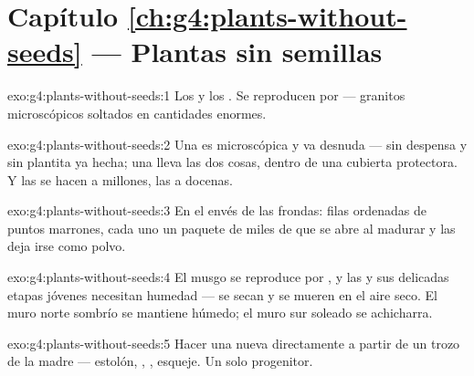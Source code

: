 \section*{Capítulo \ref{ch:g4:plants-without-seeds} --- Plantas sin semillas}

\begin{solution}{exo:g4:plants-without-seeds:1}
Los  y los . Se reproducen por  --- granitos
microscópicos soltados en cantidades enormes.
\end{solution}

\begin{solution}{exo:g4:plants-without-seeds:2}
Una  es microscópica y va desnuda --- sin despensa y sin
plantita ya hecha; una  lleva las dos cosas, dentro de una
cubierta protectora. Y las  se hacen a millones, las  a
docenas.
\end{solution}

\begin{solution}{exo:g4:plants-without-seeds:3}
En el envés de las frondas: filas ordenadas de puntos marrones, cada
uno un paquete de miles de  que se abre al madurar y las deja
irse como polvo.
\end{solution}

\begin{solution}{exo:g4:plants-without-seeds:4}
El musgo se reproduce por , y las  y sus delicadas
etapas jóvenes necesitan humedad --- se secan y se mueren en el aire
seco. El muro norte sombrío se mantiene húmedo; el muro sur soleado se
achicharra.
\end{solution}

\begin{solution}{exo:g4:plants-without-seeds:5}
Hacer una  nueva directamente a partir de un trozo de la 
madre --- estolón, , , esqueje. Un solo progenitor.
\end{solution}

